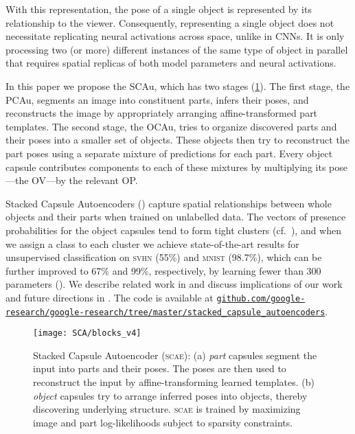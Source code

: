 With this representation, the pose of a single object is represented by its relationship to the viewer.
Consequently, representing a single object does not necessitate replicating neural activations across space, unlike in \glspl{CNN}.
It is only processing two (or more) different instances of the same type of object in parallel that requires spatial replicas of both model parameters and neural activations.

In this paper we propose the \gls{SCAu}, which has two stages (\cref{fig:capsule_arch}).
The first stage, the \gls{PCAu}, segments an image into constituent parts, infers their poses, and reconstructs the image by appropriately arranging affine-transformed part templates.
The second stage, the \gls{OCAu}, tries to organize discovered parts and their poses into a smaller set of objects.
These objects then try to reconstruct the part poses using a separate mixture of predictions for each part. 
Every object capsule contributes components to each of these mixtures by multiplying its pose---the \gls{OV}---by the relevant \gls{OP}.

Stacked Capsule Autoencoders () capture spatial relationships between whole objects and their parts when trained on unlabelled data.
The vectors of presence probabilities for the object capsules tend to form tight clusters (cf.\ ), and when we assign a class to each cluster we achieve state-of-the-art results for unsupervised classification on \textsc{svhn} (55\%) and \textsc{mnist} (98.7\%), which can be further improved to 67\% and 99\%, respectively, by learning fewer than 300 parameters 
().
We describe related work in  and discuss implications of our work and future directions in .
The code is available at {\small \href{https://github.com/google-research/google-research/tree/master/stacked_capsule_autoencoders}{\texttt{github.com/google-research/google-research/tree/master/stacked\_capsule\_autoencoders}}}.

\begin{figure}
    \centering
        \texttt{[image: SCA/blocks\_v4]}
        \caption{
            Stacked Capsule Autoencoder (\textsc{scae}):
            (a) \textit{part} capsules segment the input into parts and their poses. The poses are then used to reconstruct the input by affine-transforming learned templates.
            (b) \textit{object} capsules try to arrange inferred poses into objects, thereby discovering underlying structure.
            \textsc{scae} is trained by maximizing image and part log-likelihoods subject to sparsity constraints.
        }
        \label{fig:capsule_arch}
\end{figure}